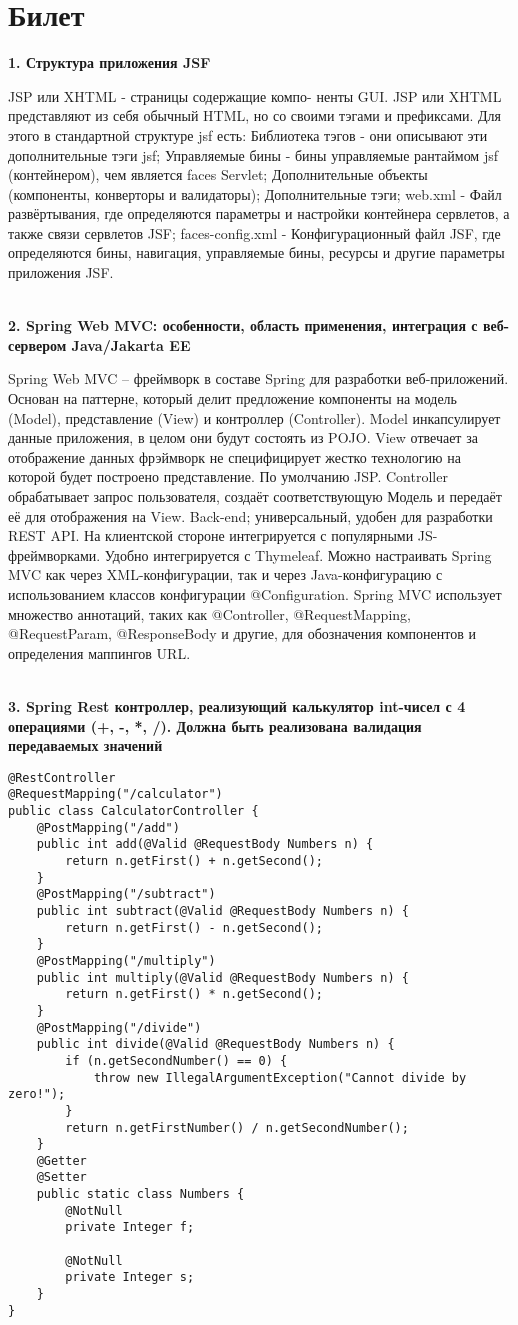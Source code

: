 \documentclass{article}
\newcommand{\bil}[5]{%
        \section{Билет}
        \textbf{1. #1}

        #4
        \\
        \textbf{2. #2}
        
        #5
        \\
        \textbf{3. #3}
}
\begin{document}
\bil{Структура приложения JSF}
{Spring Web MVC: особенности, область применения, интеграция с веб-сервером Java/Jakarta EE}
{Spring Rest контроллер, реализующий калькулятор int-чисел с 4 операциями (+, -, *, /). Должна быть реализована валидация передаваемых значений}{
    JSP или XHTML - страницы содержащие компо- ненты GUI. 
    JSP или XHTML представляют из себя обычный HTML, но со своими тэгами и префиксами. 
    Для этого в стандартной структуре jsf есть: Библиотека тэгов - они описывают эти дополнительные тэги jsf; 
    Управляемые бины - бины управляемые рантаймом jsf (контейнером), чем является faces Servlet; 
    Дополнительные объекты (компоненты, конверторы и валидаторы); 
    Дополнительные тэги; web.xml - Файл развёртывания, где определяются параметры и настройки контейнера сервлетов, а также связи сервлетов JSF; 
    faces-config.xml - Конфигурационный файл JSF, где определяются бины, навигация, управляемые бины, ресурсы и другие параметры приложения JSF.
}{
    Spring Web MVC – фреймворк в составе Spring для разработки веб-приложений. 
    Основан на паттерне, который делит предложение компоненты на модель (Model), представление (View) и контроллер (Controller). 
    Model инкапсулирует данные приложения, в целом они будут состоять из POJO. 
    View отвечает за отображение данных фрэймворк не специфицирует жестко технологию на которой будет построено представление. 
    По умолчанию JSP. Controller обрабатывает запрос пользователя, создаёт соответствующую Модель и передаёт её для отображения на View. 
    Back-end; универсальный, удобен для разработки REST API. На клиентской стороне интегрируется с популярными JS-фреймворками. 
    Удобно интегрируется с Thymeleaf. Можно настраивать Spring MVC как через XML-конфигурации, так и через Java-конфигурацию с использованием классов конфигурации @Configuration. 
    Spring MVC использует множество аннотаций, таких как @Controller, @RequestMapping, @RequestParam, @ResponseBody и другие, для обозначения компонентов и определения маппингов URL.
}
\begin{lstlisting}[frame=single, basicstyle=\ttfamily, breaklines=true, breakatwhitespace=true, postbreak=\mbox{\textcolor{red}{$\hookrightarrow$}\space}]
@RestController
@RequestMapping("/calculator")
public class CalculatorController {
    @PostMapping("/add")
    public int add(@Valid @RequestBody Numbers n) {
        return n.getFirst() + n.getSecond();
    }
    @PostMapping("/subtract")
    public int subtract(@Valid @RequestBody Numbers n) {
        return n.getFirst() - n.getSecond();
    }
    @PostMapping("/multiply")
    public int multiply(@Valid @RequestBody Numbers n) {
        return n.getFirst() * n.getSecond();
    }
    @PostMapping("/divide")
    public int divide(@Valid @RequestBody Numbers n) {
        if (n.getSecondNumber() == 0) {
            throw new IllegalArgumentException("Cannot divide by zero!");
        }
        return n.getFirstNumber() / n.getSecondNumber();
    }
    @Getter
    @Setter
    public static class Numbers {
        @NotNull
        private Integer f;

        @NotNull
        private Integer s;
    }
}
\end{lstlisting}
\end{document}
